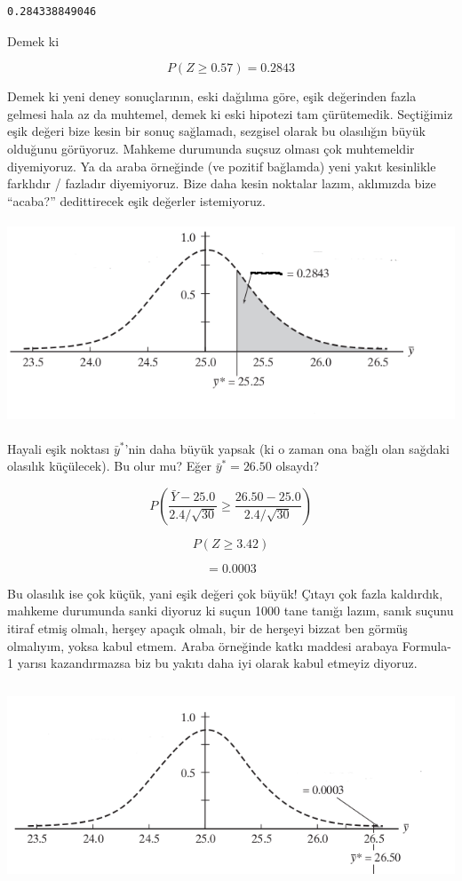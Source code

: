 \documentclass[12pt,fleqn]{article}\usepackage{../../common}
\begin{document}
\begin{verbatim}
0.284338849046
\end{verbatim}

Demek ki

$$ P(Z \ge 0.57) = 0.2843$$

Demek ki yeni deney sonuçlarının, eski dağılıma göre, eşik değerinden fazla
gelmesi hala az da muhtemel, demek ki eski hipotezi tam
çürütemedik. Seçtiğimiz eşik değeri bize kesin bir sonuç sağlamadı,
sezgisel olarak bu olasılığın büyük olduğunu görüyoruz. Mahkeme durumunda
suçsuz olması çok muhtemeldir diyemiyoruz. Ya da araba örneğinde (ve
pozitif bağlamda) yeni yakıt kesinlikle farklıdır / fazladır
diyemiyoruz. Bize daha kesin noktalar lazım, aklımızda bize ``acaba?''
dedittirecek eşik değerler istemiyoruz.

\includegraphics[height=6cm]{carhyp1.png}

Hayali eşik noktası $\bar{y}^\ast$'nin daha büyük yapsak (ki o zaman ona bağlı
olan sağdaki olasılık küçülecek). Bu olur mu? Eğer $\bar{y}^\ast = 26.50$
olsaydı? 

$$ P(\frac{\bar{Y} - 25.0}{2.4 / \sqrt{30}} \ge 
\frac{26.50 - 25.0}{2.4 / \sqrt{30}}) 
$$

$$ P(Z \ge 3.42) $$

$$ = 0.0003 $$

Bu olasılık ise çok küçük, yani eşik değeri çok büyük! Çıtayı çok fazla
kaldırdık, mahkeme durumunda sanki diyoruz ki suçun 1000 tane tanığı lazım,
sanık suçunu itiraf etmiş olmalı, herşey apaçık olmalı, bir de herşeyi
bizzat ben görmüş olmalıyım, yoksa kabul etmem. Araba örneğinde katkı
maddesi arabaya Formula-1 yarısı kazandırmazsa biz bu yakıtı daha iyi
olarak kabul etmeyiz diyoruz.

\includegraphics[height=6cm]{carhyp2.png}
\end{document}
